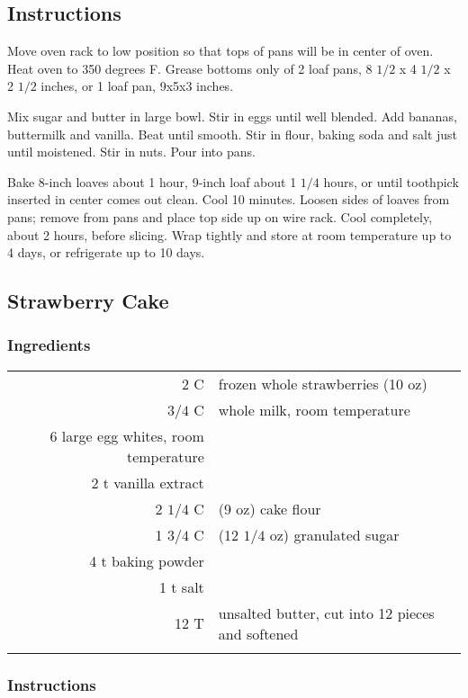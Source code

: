 \documentclass[12pt,landscape,twoside,twocolumn, openright, titlepage, draft]{book}
\begin{document}
\subsection{Instructions}
Move oven rack to low position so that tops of pans will be in center of oven. Heat oven to 350 degrees F. Grease bottoms only of 2 loaf pans, 8 $1/2$ x 4 $1/2$ x 2 $1/2$ inches, or 1 loaf pan, 9x5x3 inches. 

Mix sugar and butter in large bowl. Stir in eggs until well blended. Add bananas, buttermilk and vanilla. Beat until smooth. Stir in flour, baking soda and salt just until moistened. Stir in nuts. Pour into pans. 

Bake 8-inch loaves about 1 hour, 9-inch loaf about 1 $1/4$ hours, or until toothpick inserted in center comes out clean. Cool 10 minutes. Loosen sides of loaves from pans; remove from pans and place top side up on wire rack. Cool completely, about 2 hours, before slicing. Wrap tightly and store at room temperature up to 4 days, or refrigerate up to 10 days. 

\subsection{Strawberry Cake}
\subsubsection{Ingredients}
\begin{tabular}{r p{1.5in}}
    2 C & frozen whole strawberries (10 oz) \\
    $3/4$ C & whole milk, room temperature \\
    6 large egg whites, room temperature \\
    2 t vanilla extract \\
    2 $1/4$ C & (9 oz) cake flour \\
    1 $3/4$ C & (12 $1/4$ oz) granulated sugar \\
    4 t baking powder \\
    1 t salt \\
    12 T & unsalted butter, cut into 12 pieces and softened \\ \\
\end{tabular}

\subsubsection{Instructions}
\end{document}
